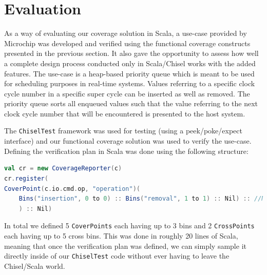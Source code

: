 \documentclass[runningheads]{llncs}
\begin{document}

\section{Evaluation}

As a way of evaluating our coverage solution in Scala, a use-case provided by Microchip was developed and verified using the functional coverage constructs presented in the previous section. It also gave the opportunity to assess how well a complete design process conducted only in Scala/Chisel works with the added features. The use-case is a heap-based priority queue which is meant to be used for scheduling purposes in real-time systems. Values referring to a specific clock cycle number in a specific super cycle can be inserted as well as removed. The priority queue sorts all enqueued values such that the value referring to the next clock cycle number that will be encountered is presented to the host system. 

The \texttt{ChiselTest} framework was used for testing (using a peek/poke/expect interface) and our functional coverage solution was used to verify the use-case. Defining the verification plan in Scala was done using the following structure:  
\begin{lstlisting}[language=scala]
val cr = new CoverageReporter(c)
cr.register(
CoverPoint(c.io.cmd.op, "operation")(
    Bins("insertion", 0 to 0) :: Bins("removal", 1 to 1) :: Nil) :: //More CoverPoints
    ) :: Nil)
\end{lstlisting}
In total we defined 5 \texttt{CoverPoints} each having up to 3 bins and 2 \texttt{CrossPoints} each having up to 5 cross bins. This was done in roughly 20 lines of Scala, meaning that once the verification plan was defined, we can simply sample it directly inside of our \texttt{ChiselTest} code without ever having to leave the Chisel/Scala world.
\end{document}
